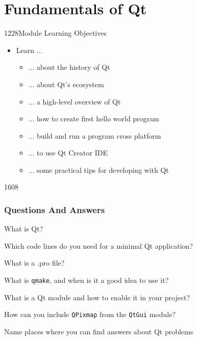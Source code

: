 %
%
%
%

\section{Fundamentals of Qt}

\begin{slide}{1228}{Module Learning Objectives}
  \label{fundamentals}
  \begin{itemize}
  \item Learn ...
    \begin{itemize}
    \item ... about the history of Qt
    \item ... about Qt's ecosystem
    \item ... a high-level overview of Qt
    \item ... how to create first hello world program
    \item ... build and run a program cross platform
    \item ... to use Qt Creator IDE
    \item ... some practical tips for developing with Qt
    \end{itemize}
  \end{itemize}
\end{slide}







\begin{slide}{1608}
  \frametitle{Questions And Answers}
  \begin{questionize}
  \item What is Qt?
  \item Which code lines do you need for a minimal Qt application?
  \item What is a .pro file?
  \item What is \texttt{qmake}, and when is it a good idea to use it?
  \item What is a Qt module and how to enable it in your project?
  \item How can you include \texttt{QPixmap} from the \texttt{QtGui} module?
  \item Name places where you can find answers about Qt problems
  \end{questionize}
\end{slide}



% 
